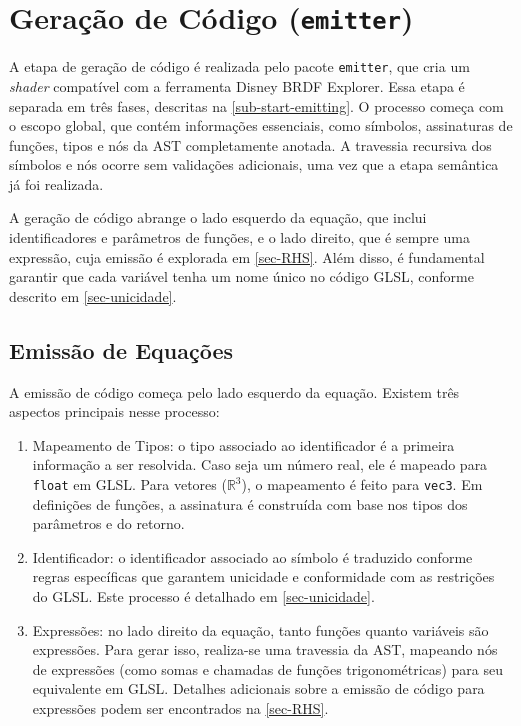 
\section{Geração de Código (\texttt{emitter})} \label{section-emitter}


A etapa de geração de código é realizada pelo pacote \texttt{emitter}, que cria um \textit{shader} compatível com a ferramenta Disney BRDF Explorer. Essa etapa é separada em três fases, descritas na \autoref{sub-start-emitting}. O processo começa com o escopo global, que contém informações essenciais, como símbolos, assinaturas de funções, tipos e nós da AST completamente anotada. A travessia recursiva dos símbolos e nós ocorre sem validações adicionais, uma vez que a etapa semântica já foi realizada.

A geração de código abrange o lado esquerdo da equação, que inclui identificadores e parâmetros de funções, e o lado direito, que é sempre uma expressão, cuja emissão é explorada em \autoref{sec-RHS}. Além disso, é fundamental garantir que cada variável tenha um nome único no código GLSL, conforme descrito em \autoref{sec-unicidade}.

\subsection{Emissão de Equações} \label{subsection-emission}

A emissão de código começa pelo lado esquerdo da equação. Existem três aspectos principais nesse processo:
\begin{enumerate}
    \item Mapeamento de Tipos: o tipo associado ao identificador é a primeira informação a ser resolvida. Caso seja um número real, ele é mapeado para \verb"float" em GLSL. Para vetores ($\mathbb{R}^3$), o mapeamento é feito para \verb"vec3". Em definições de funções, a assinatura é construída com base nos tipos dos parâmetros e do retorno.

    \item Identificador: o identificador associado ao símbolo é traduzido conforme regras específicas que garantem unicidade e conformidade com as restrições do GLSL. Este processo é detalhado em \autoref{sec-unicidade}.

    \item Expressões: no lado direito da equação, tanto funções quanto variáveis são expressões. Para gerar isso, realiza-se uma travessia da AST, mapeando nós de expressões (como somas e chamadas de funções trigonométricas) para seu equivalente em GLSL. Detalhes adicionais sobre a emissão de código para expressões podem ser encontrados na \autoref{sec-RHS}.
\end{enumerate}



